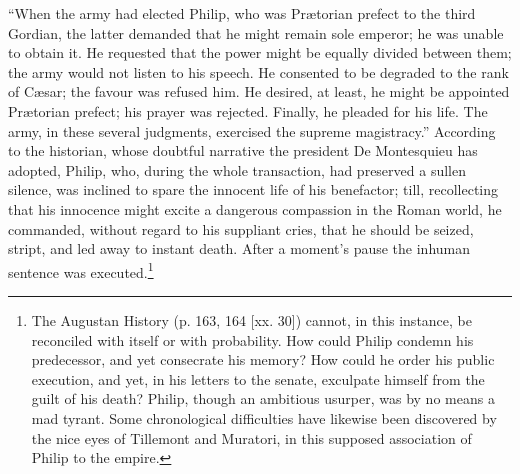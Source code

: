 \texthebrew{“}When the army had elected Philip, who was Prætorian prefect to the third Gordian, the latter demanded that he might remain sole emperor; he was unable to obtain it. He requested that the power might be equally divided between them; the army would not listen to his speech. He consented to be degraded to the rank of Cæsar; the favour was refused him. He desired, at least, he might be appointed Prætorian prefect; his prayer was rejected. Finally, he pleaded for his life. The army, in these several judgments, exercised the supreme magistracy.\texthebrew{}” According to the historian, whose doubtful narrative the president De Montesquieu has adopted, Philip, who, during the whole transaction, had preserved a sullen silence, was inclined to spare the innocent life of his benefactor; till, recollecting that his innocence might excite a dangerous compassion in the Roman world, he commanded, without regard to his suppliant cries, that he should be seized, stript, and led away to instant death. After a moment\texthebrew{}’s pause the inhuman sentence was executed.\footnote{The Augustan History (p. 163, 164 [xx. 30]) cannot, in this instance, be reconciled with itself or with probability. How could Philip condemn his predecessor, and yet consecrate his memory? How could he order his public execution, and yet, in his letters to the senate, exculpate himself from the guilt of his death? Philip, though an ambitious usurper, was by no means a mad tyrant. Some chronological difficulties have likewise been discovered by the nice eyes of Tillemont and Muratori, in this supposed association of Philip to the empire.}

